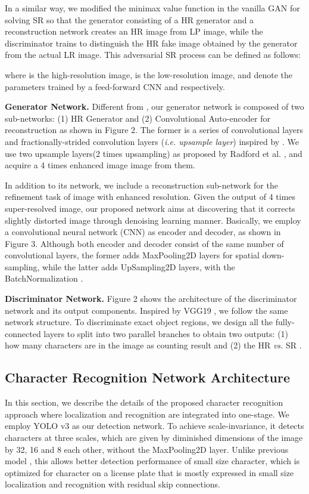 \documentclass[a4paper,twoside]{article}
\begin{document}
    
    In a similar way, we modified the minimax value function in the vanilla GAN for solving SR so that the generator  consisting of a HR generator  and a reconstruction network  creates an HR image from LP image, while the discriminator  trains to distinguish the HR fake image obtained by the generator from the actual LR image. This adversarial SR process can be defined as follows:

     where  is the high-resolution image,  is the low-resolution image,  and  denote the parameters trained by a feed-forward CNN  and  respectively. 
     
     \textbf{Generator Network.} Different from \cite{goodfellow2014generative}, our generator network is composed of two sub-networks: (1) HR Generator  and (2) Convolutional Auto-encoder for reconstruction  as shown in Figure 2. The former is a series of convolutional layers and fractionally-strided convolution layers (\textit{i.e. upsample layer}) inspired by \cite{ledig2017photo}. We use two upsample layers(2 times upsampling) as proposed by Radford et al. \cite{radford2015unsupervised}, and acquire a 4 times enhanced image image from them. 
     
     In addition to its network, we include a reconstruction sub-network for the refinement task of image with enhanced resolution. Given the output of 4 times super-resolved image, our proposed network aims at discovering that it corrects slightly distorted image through denoising learning manner. Basically, we employ a convolutional neural network (CNN) as encoder and decoder, as shown in Figure 3. Although both encoder and decoder consist of the same number of convolutional layers, the former adds MaxPooling2D layers for spatial down-sampling, while the latter adds UpSampling2D layers, with the BatchNormalization \cite{ioffe2015batch}. 
     
     \textbf{Discriminator Network.} Figure 2 shows the architecture of the discriminator network and its output components. Inspired by VGG19 \cite{simonyan2014very}, we follow the same network structure. To discriminate exact object regions, we design all the fully-connected layers to split into two parallel branches to obtain two outputs: (1) how many characters are in the image as counting result  and (2) the HR \textit{vs.} SR . 
     
\subsection{Character Recognition Network Architecture}
     In this section, we describe the details of the proposed character recognition approach where localization and recognition are integrated into one-stage. We employ YOLO v3 \cite{redmon2018yolov3} as our detection network. To achieve scale-invariance, it detects characters at three scales, which are given by diminished dimensions of the image by 32, 16 and 8 each other, without the MaxPooling2D layer. Unlike previous model \cite{redmon2017yolo9000}, this allows better detection performance of small size character, which is optimized for character on a license plate that is mostly expressed in small size localization and recognition with residual skip connections. 
     
\end{document}
